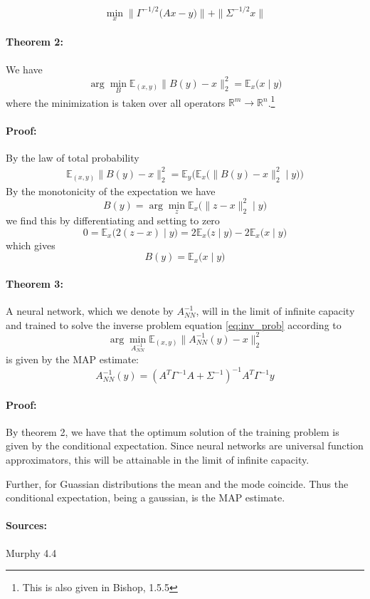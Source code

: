 \documentclass[a4paper,10pt]{article}
\begin{document}
	\[
		\min_x \| \Gamma^{-1/2} \bigl(Ax - y\bigr) \| + \|\Sigma^{-1/2} x\|
	\]
	
	\paragraph{Theorem 2:} We have
	\[
		\arg \min_{B} \mathbb{E}_{(x, y)} \|B(y) - x\|_2^2 = \mathbb{E}_{x}\bigl(x \mid y \bigr)
	\]
	where the minimization is taken over all operators $\mathbb{R}^m \to \mathbb{R}^n$.\footnote{This is also given in Bishop, 1.5.5}
	
	\paragraph{Proof:} By the law of total probability
	\begin{align*}
		\mathbb{E}_{(x, y)} \|B(y) - x\|_2^2 = 
		\mathbb{E}_{y} \bigl(\mathbb{E}_{x}\bigl(\|B(y) - x\|_2^2 \mid y \bigr)\bigr)
	\end{align*}
	By the monotonicity of the expectation we have
	\[
		B(y) = \arg\min_{z} \mathbb{E}_{x}\bigl(\|z - x\|_2^2 \mid y \bigr)
	\]
	we find this by differentiating and setting to zero
	\[
	    0 =
	    \mathbb{E}_{x}\bigl(2 (z - x) \mid y \bigr) =
	    2\mathbb{E}_{x}\bigl(z \mid y \bigr) - 2\mathbb{E}_{x}\bigl(x \mid y \bigr)
	\]
	which gives
	\[
		B(y) = \mathbb{E}_{x}\bigl(x \mid y \bigr)
	\]
	
	\paragraph{Theorem 3:} A neural network, which we denote by $A^{-1}_{NN}$, will in the limit of infinite capacity and trained to solve the inverse problem equation \ref{eq:inv_prob} according to
	\[
		\arg \min_{A^{-1}_{NN}} \mathbb{E}_{(x, y)} \|A^{-1}_{NN}(y) - x\|_2^2
	\]
	is given by the MAP estimate:
	\[
		A^{-1}_{NN}(y) = (A^T \Gamma^{-1} A + \Sigma^{-1})^{-1} A^T \Gamma^{-1} y
	\]
	
	\paragraph{Proof:} By theorem 2, we have that the optimum solution of the training problem is given by the conditional expectation. Since neural networks are universal function approximators, this will be attainable in the limit of infinite capacity.
	
	Further, for Guassian distributions the mean and the mode coincide. Thus the conditional expectation, being a gaussian, is the MAP estimate.
	
	\paragraph{Sources:}
	
	Murphy 4.4
	
\end{document}
